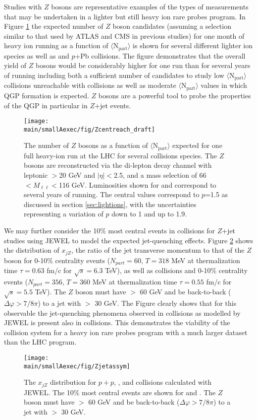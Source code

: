 \documentclass[../report.tex]{subfiles}
\providecommand{\main}{..}
\begin{document}
Studies with $Z$ bosons are representative examples of the types of measurements that may be undertaken in a lighter but still heavy ion rare probes program.  In Figure \ref{fig:Zreach} the expected number of $Z$ boson candidates (assuming a selection similar to that used by ATLAS and CMS in previous studies) for one month of heavy ion running  as a function of $\langle \mathrm{N_{part}}\rangle$ is shown for several different lighter ion species as well as \PbPb and $p$+Pb collisions.  The figure demonstrates that the overall yield of $Z$ bosons would be considerably higher for one \ArAr run than for several years of \PbPb running including both a sufficient number of candidates to study low $\langle \mathrm{N_{part}}\rangle$ collisions unreachable with \PbPb collisions as well as moderate $\langle \mathrm{N_{part}}\rangle$ values in which QGP formation is expected.  $Z$ bosons are a powerful tool to probe the properties of the QGP in particular in $Z$+jet events.  
\begin{figure}
\centering
\texttt{[image: \\main/smallAexec/fig/Zcentreach\_draft]}
\caption{
The number of $Z$ bosons as a function of $\langle \mathrm{N_{part}}\rangle$ expected for one full heavy-ion run at the LHC for several collisions species.  The $Z$ bosons are reconstructed via the di-lepton decay channel with leptonic \pT$>$20 GeV and $|\eta|<$2.5, and a mass selection of 66$<M_{\ell\ell}<$116 GeV.  Luminosities shown for \PbPb and \pPb correspond to several years of running.  The central values correspond to $p$=1.5 as discussed in section \ref{sec:lightions}, with the uncertainties representing a variation of $p$ down to 1 and up to 1.9.
\label{fig:Zreach}}
\end{figure}

We may further consider the 10\% most central events in \ArAr collisions for $Z$+jet studies using JEWEL \cite{Zapp:2009ud} to model the expected jet-quenching effects.  Figure \ref{fig:ArAr_xjz} shows the distribution of $x_{jZ}$, the ratio of the jet transverse momentum to that of the $Z$ boson for 0-10\% centrality \ArAr events ($N_{part} = 60$, $T=318$ MeV at thermalization time $\tau = 0.63$ fm/c for $\sqrt{s}=6.3$ TeV), as well as \pp collisions and 0-10\% centrality \PbPb events ($N_{part} = 356$, $T=360$ MeV at thermalization time $\tau = 0.55$ fm/c for $\sqrt{s}=5.5$ TeV).  The $Z$ boson must have \pt $>$ 60 GeV and be back-to-back ($\Delta\varphi > 7/8\pi$) to a jet with \pt $>$ 30 GeV.  The Figure clearly shows that for this observable the jet-quenching phenomena observed in \PbPb collisions as modelled by JEWEL is present also in \ArAr collisions.  This demonstrates the viability of the \ArAr collision system for a heavy ion rare probes program with a much larger dataset than the LHC \PbPb program.
\begin{figure}
\centering
\texttt{[image: \\main/smallAexec/fig/Zjetassym]}
\caption{
The $x_{jZ}$ distribution for $p+p$, \PbPb, and \ArAr collisions calculated with JEWEL.  The 10\% most central events are shown for \PbPb and \ArAr.  The $Z$ boson must have \pt $>$ 60 GeV and be back-to-back ($\Delta\varphi > 7/8\pi$) to a jet with \pt $>$ 30 GeV.    
\label{fig:ArAr_xjz}}
\end{figure}
\end{document}
